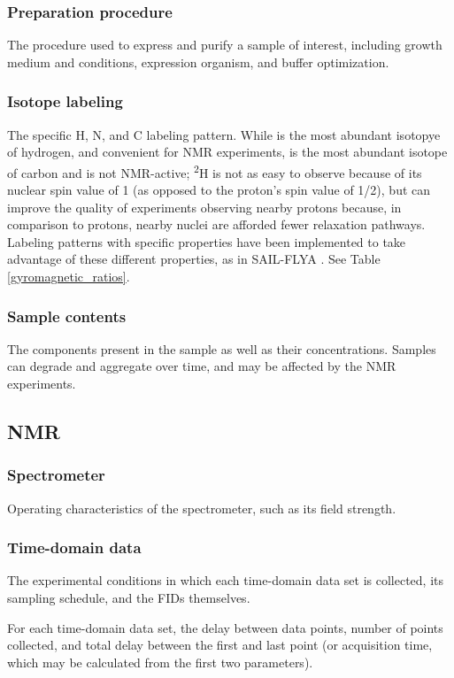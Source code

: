 \subsubsection{Preparation procedure}
The procedure used to express and purify a sample of interest, including
growth medium and conditions, expression organism, and buffer optimization.

\subsubsection{Isotope labeling}
The specific H, N, and C labeling pattern.  While \nmrisoh{} is 
the most abundant isotopye of hydrogen, and convenient for NMR experiments,
\nmrisoc{} is the most abundant isotope of carbon and is not 
NMR-active; \textsuperscript{2}H is not as easy to observe because of
its nuclear spin value of 1 (as opposed to the proton's spin value of 1/2),
but can improve the quality of experiments observing nearby protons because,
in comparison to protons, nearby nuclei are afforded fewer relaxation pathways.
Labeling patterns with specific properties have been implemented to take
advantage of these different properties, as in SAIL-FLYA \cite{sail_flya}.
See Table \ref{gyromagnetic_ratios}.

\subsubsection{Sample contents}
The components present in the sample as well as their concentrations.
Samples can degrade and aggregate over time, and may be affected by the
NMR experiments.

\subsection*{NMR}

\subsubsection{Spectrometer}
Operating characteristics of the spectrometer, such as its field strength.

\subsubsection{Time-domain data}
The experimental conditions in which each time-domain data set is collected, 
its sampling schedule, and the FIDs themselves.

For each time-domain data set, the delay between data points, number of 
points collected, and total delay between the first and last point (or 
acquisition time, which may be calculated from the first two parameters).

